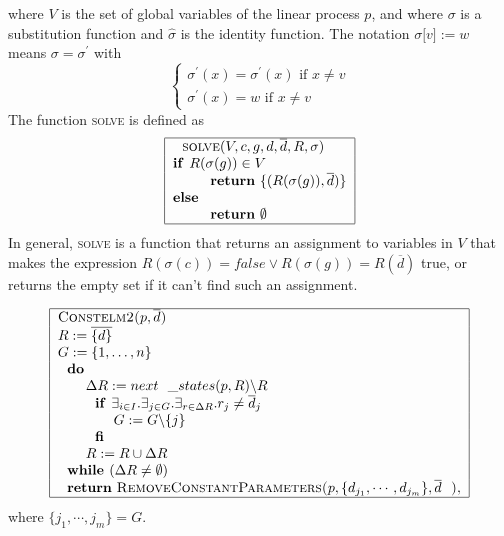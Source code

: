 \documentclass{article}
\begin{document}
where $V$ is the set of global variables of the linear process $p$, and
where $\sigma $ is a substitution function and $\widehat{\sigma }$ is the
identity function. The notation $\sigma \lbrack v]:=w$ means $\sigma =\sigma
^{\prime }$ with%
\[
\left\{ 
\begin{array}{l}
\sigma ^{\prime }(x)=\sigma ^{\prime }(x)\text{ if }x\neq v \\ 
\sigma ^{\prime }(x)=w\text{ if }x\neq v%
\end{array}%
\right. 
\]%
The function \textsc{solve} is defined as%
\[
\begin{tabular}{|l|}
\hline
$\text{\textsc{solve}}(V,c,g,d,\overline{d},R,\sigma )$ \\ 
\textbf{if }$R(\sigma (g))\in V$ \\ 
$\qquad \text{\textbf{return} }\{(R(\sigma (g)),\overline{d})\}$ \\ 
\textbf{else} \\ 
$\qquad \text{\textbf{return} }\emptyset $ \\ \hline
\end{tabular}%
\]%
In general,  \textsc{solve} is a function that returns an assignment to
variables in $V$ that makes the expression $R(\sigma (c))=false\vee R(\sigma
(g))=R(\overline{d})$ true, or returns the empty set if it can't find such
an assignment.

\[
\begin{tabular}{|l|}
\hline
\textsc{Constelm2(}$p,\overline{d}$\textsc{)} \\ 
$R:=\overline{\{d\}}$ \\ 
$G:=\{1,\ldots ,n\}$ \\ 
$\text{\textbf{do}}$ \\ 
$\qquad \Delta R:=next\_states(p,R)\backslash R$ \\ 
$\qquad \text{\textbf{if }}\exists _{i\in I}.\exists _{j\in G}.\exists
_{r\in \Delta R}.r_{j}\neq \overline{d}_{j}$ \\ 
$\qquad \qquad G:=G\backslash \{j\}$ \\ 
$\qquad \text{\textbf{fi}}$ \\ 
$\qquad R:=R\cup \Delta R$ \\ 
$\text{\textbf{while }}(\Delta R\neq \emptyset )$ \\ 
$\text{\textbf{return} \textsc{RemoveConstantParameters(}}%
p,\{d_{j_{1}},\cdots ,d_{j_{m}}\},\overline{d}\text{\textsc{)}},$ \\ \hline
\end{tabular}%
\]%
where $\{j_{1},\cdots ,j_{m}\}=G$.
\end{document}
